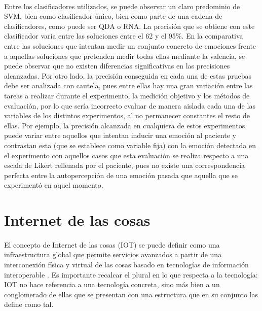 \paragraph{}
Entre los clasificadores utilizados, se puede observar un claro predominio de SVM, bien como clasificador único, bien como parte de una cadena de clasificadores, como puede ser QDA o RNA. La precisión que se obtiene con este clasificador varía entre las soluciones entre el 62 y el 95\%. En la comparativa entre las soluciones que intentan medir un conjunto concreto de emociones frente a aquellas soluciones que pretenden medir todas ellas mediante la valencia, se puede observar que no existen diferencias significativas en las precisiones alcanzadas. Por otro lado, la precisión conseguida en cada una de estas pruebas debe ser analizada con cautela, pues entre ellas hay una gran variación entre las tareas a realizar durante el experimento, la medición objetivo y los métodos de evaluación, por lo que sería incorrecto evaluar de manera aislada cada una de las variables de los distintos experimentos, al no permanecer constantes el resto de ellas. Por ejemplo, la precisión alcanzada en cualquiera de estos experimentos puede variar entre aquellos que intentan inducir una emoción al paciente y contrastan esta (que se establece como variable fija) con la emoción detectada en el experimento con aquellos casos que esta evaluación se realiza respecto a una escala de Likert rellenada por el paciente, pues no existe una correspondencia perfecta entre la autopercepción de una emoción pasada que aquella que se experimentó en aquel momento.


\section{Internet de las cosas}
\paragraph{}
El concepto de Internet de las cosas (IOT) se puede definir como una infraestructura global que permite servicios avanzados a partir de una interconexión física y virtual de las cosas basado en tecnologías de información interoperable \citep{itu2012new}. Es importante recalcar el plural en lo que respecta a la tecnología: IOT no hace referencia a una tecnología concreta, sino más bien a un conglomerado de ellas que se presentan con una estructura que en su conjunto las define como tal.

